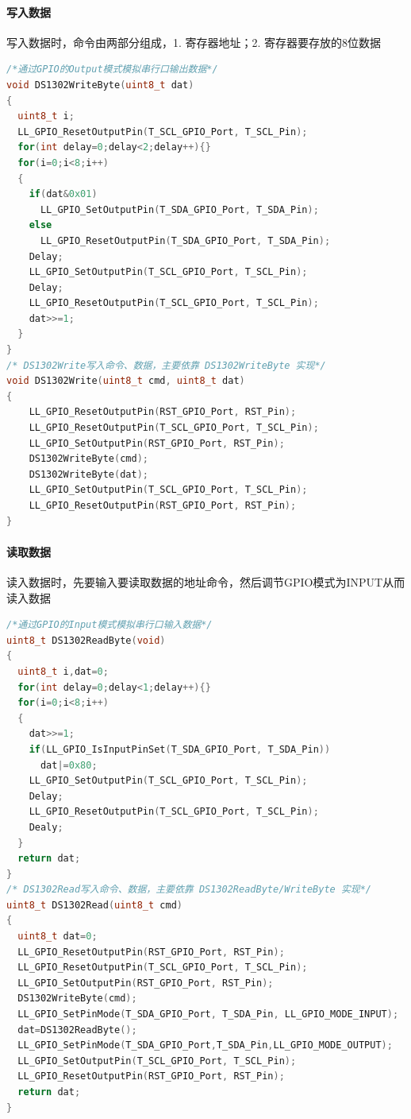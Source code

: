\documentclass{article}
\begin{document}
\paragraph{写入数据}写入数据时，命令由两部分组成，1. 寄存器地址；2. 寄存器要存放的8位数据\par
\begin{multicols}{2}
\begin{lstlisting}[language=c]
/*通过GPIO的Output模式模拟串行口输出数据*/
void DS1302WriteByte(uint8_t dat)
{
  uint8_t i;
  LL_GPIO_ResetOutputPin(T_SCL_GPIO_Port, T_SCL_Pin);
  for(int delay=0;delay<2;delay++){}
  for(i=0;i<8;i++)
  {
    if(dat&0x01)
      LL_GPIO_SetOutputPin(T_SDA_GPIO_Port, T_SDA_Pin);
    else
      LL_GPIO_ResetOutputPin(T_SDA_GPIO_Port, T_SDA_Pin);
    Delay;
    LL_GPIO_SetOutputPin(T_SCL_GPIO_Port, T_SCL_Pin);
    Delay;
    LL_GPIO_ResetOutputPin(T_SCL_GPIO_Port, T_SCL_Pin);
    dat>>=1;
  }
}
/* DS1302Write写入命令、数据，主要依靠 DS1302WriteByte 实现*/
void DS1302Write(uint8_t cmd, uint8_t dat)
{
    LL_GPIO_ResetOutputPin(RST_GPIO_Port, RST_Pin);
    LL_GPIO_ResetOutputPin(T_SCL_GPIO_Port, T_SCL_Pin);
    LL_GPIO_SetOutputPin(RST_GPIO_Port, RST_Pin);
    DS1302WriteByte(cmd);
    DS1302WriteByte(dat);
    LL_GPIO_SetOutputPin(T_SCL_GPIO_Port, T_SCL_Pin);
    LL_GPIO_ResetOutputPin(RST_GPIO_Port, RST_Pin);
}
\end{lstlisting}
\end{multicols}
\paragraph{读取数据}读入数据时，先要输入要读取数据的地址命令，然后调节GPIO模式为INPUT从而读入数据\par
\begin{multicols}{2}
\begin{lstlisting}[language=c]
/*通过GPIO的Input模式模拟串行口输入数据*/
uint8_t DS1302ReadByte(void)
{
  uint8_t i,dat=0;
  for(int delay=0;delay<1;delay++){}
  for(i=0;i<8;i++)
  {
    dat>>=1;
    if(LL_GPIO_IsInputPinSet(T_SDA_GPIO_Port, T_SDA_Pin))
      dat|=0x80;
    LL_GPIO_SetOutputPin(T_SCL_GPIO_Port, T_SCL_Pin);
    Delay;
    LL_GPIO_ResetOutputPin(T_SCL_GPIO_Port, T_SCL_Pin);
    Dealy;
  }
  return dat;
}
/* DS1302Read写入命令、数据，主要依靠 DS1302ReadByte/WriteByte 实现*/
uint8_t DS1302Read(uint8_t cmd)
{
  uint8_t dat=0;
  LL_GPIO_ResetOutputPin(RST_GPIO_Port, RST_Pin);
  LL_GPIO_ResetOutputPin(T_SCL_GPIO_Port, T_SCL_Pin);
  LL_GPIO_SetOutputPin(RST_GPIO_Port, RST_Pin);
  DS1302WriteByte(cmd);
  LL_GPIO_SetPinMode(T_SDA_GPIO_Port, T_SDA_Pin, LL_GPIO_MODE_INPUT);
  dat=DS1302ReadByte();
  LL_GPIO_SetPinMode(T_SDA_GPIO_Port,T_SDA_Pin,LL_GPIO_MODE_OUTPUT);
  LL_GPIO_SetOutputPin(T_SCL_GPIO_Port, T_SCL_Pin);
  LL_GPIO_ResetOutputPin(RST_GPIO_Port, RST_Pin);
  return dat;
}
\end{lstlisting}
\end{multicols}
\end{document}
